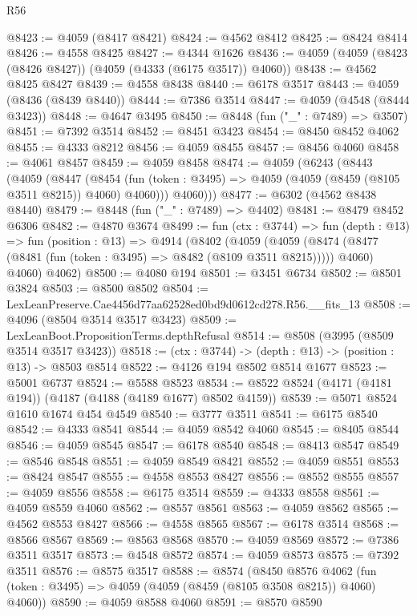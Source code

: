 \begin{lexlean}{R56}
\begin{coremodule}
@8423 := @4059 (@8417 @8421)
@8424 := @4562 @8412
@8425 := @8424 @8414
@8426 := @4558 @8425
@8427 := @4344 @1626
@8436 := @4059 (@4059 (@8423 (@8426 @8427)) (@4059 (@4333 (@6175 @3517)) @4060))
@8438 := @4562 @8425 @8427
@8439 := @4558 @8438
@8440 := @6178 @3517
@8443 := @4059 (@8436 (@8439 @8440))
@8444 := @7386 @3514
@8447 := @4059 (@4548 (@8444 @3423))
@8448 := @4647 @3495
@8450 := @8448 (fun ("_" : @7489) => @3507)
@8451 := @7392 @3514
@8452 := @8451 @3423
@8454 := @8450 @8452 @4062
@8455 := @4333 @8212
@8456 := @4059 @8455
@8457 := @8456 @4060
@8458 := @4061 @8457
@8459 := @4059 @8458
@8474 := @4059
    (@6243
      (@8443
        (@4059
          (@8447
            (@8454 (fun (token : @3495) => @4059 (@4059 (@8459 (@8105 @3511 @8215)) @4060) @4060)))
          @4060)))
@8477 := @6302 (@4562 @8438 @8440)
@8479 := @8448 (fun ("_" : @7489) => @4402)
@8481 := @8479 @8452 @6306
@8482 := @4870 @3674
@8499 := fun (ctx : @3744) =>
  fun (depth : @13) =>
  fun (position : @13) =>
  @4914
    (@8402
      (@4059
        (@4059 (@8474 (@8477 (@8481 (fun (token : @3495) => @8482 (@8109 @3511 @8215))))) @4060)
        @4060)
      @4062)
@8500 := @4080 @194
@8501 := @3451 @6734
@8502 := @8501 @3824
@8503 := @8500 @8502
@8504 := LexLeanPreserve.Cae4456d77aa62528ed0bd9d0612cd278.R56.__fits_13
@8508 := @4096 (@8504 @3514 @3517 @3423)
@8509 := LexLeanBoot.PropositionTerms.depthRefusal
@8514 := @8508 (@3995 (@8509 @3514 @3517 @3423))
@8518 := (ctx : @3744) -> (depth : @13) -> (position : @13) -> @8503 @8514
@8522 := @4126 @194 @8502 @8514 @1677
@8523 := @5001 @6737
@8524 := @5588 @8523
@8534 := @8522 @8524 (@4171 (@4181 @194)) (@4187 (@4188 (@4189 @1677) @8502 @4159))
@8539 := @5071 @8524 @1610 @1674 @454 @4549
@8540 := @3777 @3511
@8541 := @6175 @8540
@8542 := @4333 @8541
@8544 := @4059 @8542 @4060
@8545 := @8405 @8544
@8546 := @4059 @8545
@8547 := @6178 @8540
@8548 := @8413 @8547
@8549 := @8546 @8548
@8551 := @4059 @8549 @8421
@8552 := @4059 @8551
@8553 := @8424 @8547
@8555 := @4558 @8553 @8427
@8556 := @8552 @8555
@8557 := @4059 @8556
@8558 := @6175 @3514
@8559 := @4333 @8558
@8561 := @4059 @8559 @4060
@8562 := @8557 @8561
@8563 := @4059 @8562
@8565 := @4562 @8553 @8427
@8566 := @4558 @8565
@8567 := @6178 @3514
@8568 := @8566 @8567
@8569 := @8563 @8568
@8570 := @4059 @8569
@8572 := @7386 @3511 @3517
@8573 := @4548 @8572
@8574 := @4059 @8573
@8575 := @7392 @3511
@8576 := @8575 @3517
@8588 := @8574
    (@8450
      @8576
      @4062
      (fun (token : @3495) => @4059 (@4059 (@8459 (@8105 @3508 @8215)) @4060) @4060))
@8590 := @4059 @8588 @4060
@8591 := @8570 @8590

\end{coremodule}
\end{lexlean}
